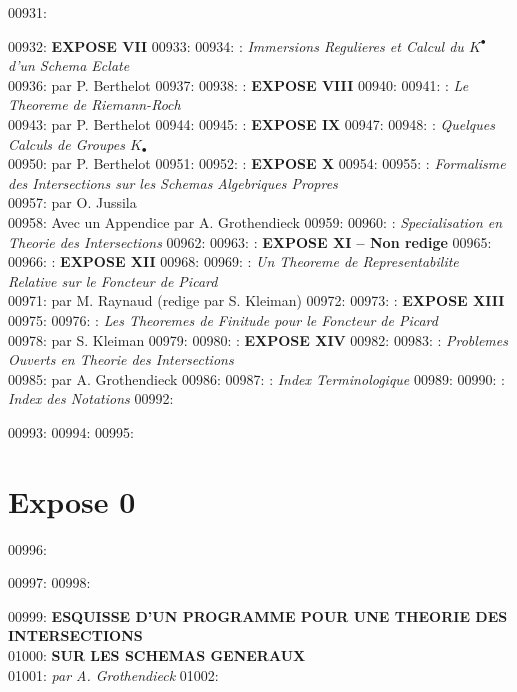 00931: \begin{center}
00932: \textbf{EXPOSE VII}
00933: 
00934: : \textit{Immersions Regulieres et Calcul du $K^{\bullet}$ d'un Schema Eclate}\\
00936: par P. Berthelot 
00937: 
00938: : \textbf{EXPOSE VIII}
00940: 
00941: : \textit{Le Theoreme de Riemann-Roch}\\
00943: par P. Berthelot 
00944: 
00945: : \textbf{EXPOSE IX}
00947: 
00948: : \textit{Quelques Calculs de Groupes $K_{\bullet}$}\\
00950: par P. Berthelot 
00951: 
00952: : \textbf{EXPOSE X}
00954: 
00955: : \textit{Formalisme des Intersections sur les Schemas Algebriques Propres}\\
00957: par O. Jussila\\
00958: Avec un Appendice par A. Grothendieck
00959: 
00960: : \textit{Specialisation en Theorie des Intersections} 
00962: 
00963: : \textbf{EXPOSE XI -- Non redige}
00965: 
00966: : \textbf{EXPOSE XII}
00968: 
00969: : \textit{Un Theoreme de Representabilite Relative sur le Foncteur de Picard}\\
00971: par M. Raynaud (redige par S. Kleiman) 
00972: 
00973: : \textbf{EXPOSE XIII}
00975: 
00976: : \textit{Les Theoremes de Finitude pour le Foncteur de Picard}\\
00978: par S. Kleiman 
00979: 
00980: : \textbf{EXPOSE XIV}
00982: 
00983: : \textit{Problemes Ouverts en Theorie des Intersections}\\
00985: par A. Grothendieck 
00986: 
00987: : \textit{Index Terminologique} 
00989: 
00990: : \textit{Index des Notations} 
00992: \end{center}
00993: 
00994: 
00995: \section*{Expose 0}
00996: 
00997: 
00998: \begin{center}
00999: \Large\textbf{ESQUISSE D'UN PROGRAMME POUR UNE THEORIE DES INTERSECTIONS}\\[0.3cm]
01000: \Large\textbf{SUR LES SCHEMAS GENERAUX}\\[0.5cm]
01001: \textit{par A. Grothendieck}
01002: \end{center}
